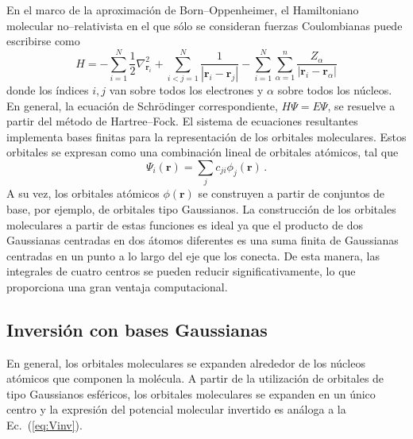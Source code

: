 En el marco de la aproximación de Born--Oppenheimer, el Hamiltoniano 
molecular no--relativista en el que sólo se consideran fuerzas 
Coulombianas puede escribirse como
\begin{equation}
H=-\sum_{i=1}^N \frac{1}{2} \nabla^2_{\mathbf{r}_i} 
  +\sum_{i<j=1}^N \frac{1}{\left|\mathbf{r}_i-\mathbf{r}_j\right|} 
  -\sum_{i=1}^N \sum_{\alpha=1}^n \frac{Z_{\alpha}}{
    \left|\mathbf{r}_i-\mathbf{r}_{\alpha}\right|} 
\label{eq:BOhamiltonian}
\end{equation}
donde los índices $i,j$ van sobre todos los electrones y $\alpha$ 
sobre todos los núcleos. En general, la ecuación de Schr\"odinger 
correspondiente, $H\Psi=E\Psi$, se resuelve a partir del método de 
Hartree--Fock. El sistema de ecuaciones resultantes implementa bases 
finitas para la representación de los orbitales moleculares. Estos 
orbitales se expresan como una combinación lineal de orbitales atómicos, 
tal que
\begin{equation}
\Psi_i(\mathbf{r})=\sum_j c_{ji} \phi_j(\mathbf{r})\,.
\end{equation}
A su vez, los orbitales atómicos $\phi(\mathbf{r})$ se construyen a 
partir de conjuntos de base, por ejemplo, de orbitales tipo Gaussianos. 
La construcción de los orbitales moleculares a partir de estas funciones 
es ideal ya que el producto de dos Gaussianas centradas en dos átomos 
diferentes es una suma finita de Gaussianas centradas en un punto a lo 
largo del eje que los conecta. De esta manera, las integrales de cuatro 
centros se pueden reducir significativamente, lo que proporciona 
una gran ventaja computacional.

\subsection{Inversión con bases Gaussianas}
\label{sec:invmol}

En general, los orbitales moleculares se expanden alrededor de los 
núcleos atómicos que componen la molécula. A partir de la utilización
de orbitales de tipo Gaussianos esféricos, los orbitales moleculares se 
expanden en un único centro y la expresión del potencial molecular 
invertido es análoga a la Ec.~(\ref{eq:Vinv}). 

